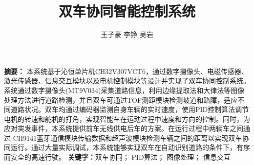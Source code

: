 \documentclass{article}%
\title{\heiti 双车协同智能控制系统}
\author{\kaishu 王子豪 \hspace{1em} 李铮 \hspace{1em} 吴岩}
\affil{(杭州电子科技大学\quad 电子信息学院， 浙江杭州， 310018)}
\date{}%
\begin{document}
	\maketitle	
	\noindent\textbf{摘要：}
		本系统基于沁恒单片机CH32V307VCT6，通过数字摄像头、电磁传感器、激光传感器、信息交互模块以及电机控制模块等设计并实现了双车协同控制系统。系统通过数字摄像头(MT9V034)采集道路信息，利用边缘提取法和大律法等图像处理方法进行道路检测，并且双车可通过TOF测距模块检测坡道和路障，适应不同道路状况。双车均通过编码器监测自身车辆的实时速度，使用PID控制算法调节电机的转速和舵机的打角，实现智能车在运动过程中速度和方向的控制。同时，为应对突发事件，本系统提供前车无线供电后车的方案。在运行过程中两辆车之间通过 CH9141蓝牙通信模块传输数据和超声波模块检测车辆之间的距离以实现双车协同运行。通过大量实际调试，本系统能够实现双车在自动识别道路的条件下，有序而安全的高速行驶。
	\newline%
	\textbf{关键字：}双车协同； PID算法； 图像处理； 信息交互
	
	\setcounter{section}{-1}%
		
\end{document}
